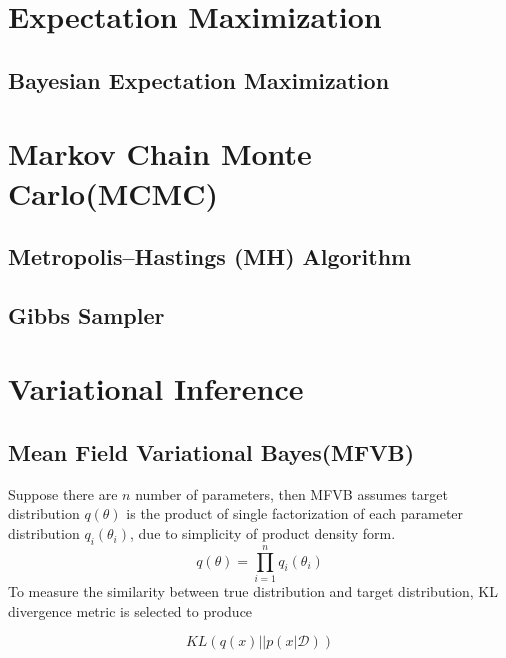 \section{Expectation Maximization}
\subsection{Bayesian Expectation Maximization}

\section{Markov Chain Monte Carlo(MCMC)}
\label{MCMC}

\subsection{Metropolis–Hastings (MH) Algorithm}
\subsection{Gibbs Sampler}

\section{Variational Inference}
\label{VI}

\subsection{Mean Field Variational Bayes(MFVB)}
Suppose there are $n$ number of parameters, then MFVB assumes target distribution $q(\theta)$ is the product of single factorization of each parameter distribution $q_i(\theta_i)$, due to simplicity of product density form. 
\begin{equation}
	q(\theta) = \prod_{i=1}^{n} q_i(\theta_i)
\end{equation}
To measure the similarity between true distribution and target distribution, KL divergence metric is selected to produce

\begin{equation}
	KL(q(x)||p(x|\mathcal{D})) 
\end{equation}








